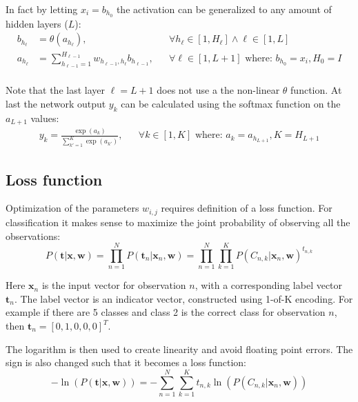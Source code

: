 In fact by letting $x_i = b_{h_0}$ the activation can be generalized to any amount of hidden layers ($L$):
\begin{equation}
\begin{aligned}
b_{h_\ell} &= \theta(a_{h_\ell}), && \forall h_{\ell} \in [1, H_{\ell}] \wedge \ell \in [1, L] \\
a_{h_\ell} &= \sum_{h_{\ell-1} = 1}^{H_{\ell-1}} w_{h_{\ell-1}, h_{\ell}} b_{h_{\ell-1}}, && \forall \ell \in [1, L+1] \text{ where: } b_{h_0} = x_i, H_0 = I \\
\end{aligned}
\end{equation}

Note that the last layer $\ell = L + 1$ does not use a the non-linear $\theta$ function. 
At last the network output $y_k$ can be calculated using the softmax function on the $a_{L+1}$ values:
\begin{equation}
\begin{aligned}
y_k = \frac{\exp(a_k)}{\sum_{k'=1}^K \exp(a_{k'})}, && \forall k \in [1, K] \text{ where: } a_k=a_{h_{L+1}}, K = H_{L + 1}
\end{aligned}
\label{eq:theory:ffnn:y}
\end{equation}

\subsection{Loss function}

Optimization of the parameters $w_{i,j}$ requires definition of a loss function. For classification it makes sense to maximize the joint probability of observing all the observations:
\begin{equation}
P(\mathbf{t} | \mathbf{x}, \mathbf{w}) = \prod_{n=1}^N P(\mathbf{t}_n | \mathbf{x}_n, \mathbf{w})  = \prod_{n=1}^N \prod_{k=1}^K P(C_{n, k} | \mathbf{x}_n, \mathbf{w})^{t_{n, k}}
\end{equation}

Here $\mathbf{x}_{n}$ is the input vector for observation $n$, with a corresponding label vector $\mathbf{t}_n$. The label vector is an indicator vector, constructed using 1-of-K encoding. For example if there are 5 classes and class 2 is the correct class for observation $n$, then $\mathbf{t}_n = [0, 1, 0, 0, 0]^T$.

The logarithm is then used to create linearity and avoid floating point errors. The sign is also changed such that it becomes a loss function:
\begin{equation}
- \ln\left(P(\mathbf{t} | \mathbf{x}, \mathbf{w})\right) = - \sum_{n=1}^N \sum_{k=1}^K t_{n, k} \ln\left( P(C_{n, k} | \mathbf{x}_n, \mathbf{w})\right)
\end{equation}

